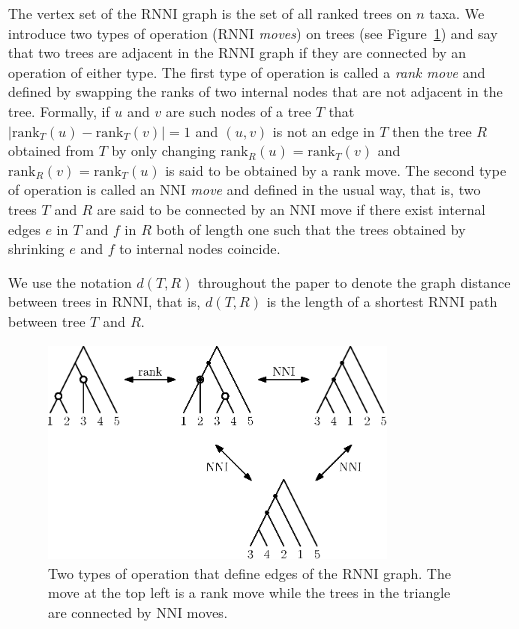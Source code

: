 \documentclass{amsart}
\newcommand{\rank}{\mathrm{rank}}
\newcommand{\nni}{\mathrm{NNI}}
\newcommand{\rnni}{\mathrm{RNNI}}
\begin{document}
The vertex set of the $\rnni$ graph is the set of all ranked trees on $n$ taxa.
We introduce two types of operation ($\rnni$ \emph{moves}) on trees (see Figure~\ref{fig:RNNI}) and say that two trees are adjacent in the $\rnni$ graph if they are connected by an operation of either type.
The first type of operation is called a \emph{rank move} and defined by swapping the ranks of two internal nodes that are not adjacent in the tree.
Formally, if $u$ and $v$ are such nodes of a tree $T$ that $|\rank_T(u) - \rank_T(v)| = 1$ and $(u, v)$ is not an edge in $T$ then the tree $R$ obtained from $T$ by only changing $\rank_R(u) = \rank_T(v)$ and $\rank_R(v) = \rank_T(u)$ is said to be obtained by a rank move.
The second type of operation is called an $\nni$ \emph{move} and defined in the usual way, that is, two trees $T$ and $R$ are said to be connected by an $\nni$ move if there exist internal edges $e$ in $T$ and $f$ in $R$ both of length one such that the trees obtained by shrinking $e$ and $f$ to internal nodes coincide.

We use the notation $d(T, R)$ throughout the paper to denote the graph distance between trees in $\rnni$, that is, $d(T, R)$ is the length of a shortest $\rnni$ path between tree $T$ and $R$.

\begin{figure}[H]
	\centering
	\includegraphics[width=0.8\textwidth]{RNNI}
    \vspace{2pt}
	\caption{Two types of operation that define edges of the $\rnni$ graph.
    The move at the top left is a rank move while the trees in the triangle are connected by $\nni$ moves.}
	\label{fig:RNNI}
\end{figure}
\end{document}
